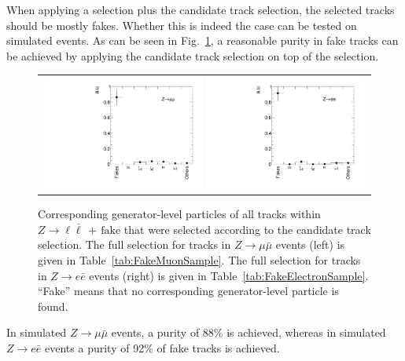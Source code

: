 When applying a \Zlep selection plus the candidate track selection, the selected tracks should be mostly fakes.
Whether this is indeed the case can be tested on simulated \Zlep events.
As can be seen in Fig.~\ref{fig:BkgComposition}, a reasonable purity in fake tracks can be achieved by applying the candidate track selection on top of the \Zlep selection.
\begin{figure}[!tb]
  \centering 
  \vspace{20pt}
  \begin{tabular}{c}
    \includegraphics[width=0.49\textwidth]{figures/analysis/Background/ParticleCompositionInFakeCS_Mu.pdf}
    \includegraphics[width=0.49\textwidth]{figures/analysis/Background/ParticleCompositionInFakeCS_Ele.pdf}
  \end{tabular}
  \caption{Corresponding generator-level particles of all tracks within $Z\rightarrow \ell \bar{\ell}\,+\,\text{fake}$ that were selected according to the candidate track selection. 
           The full selection for tracks in $Z\rightarrow \mu \bar{\mu}$ events (left) is given in Table~\ref{tab:FakeMuonSample}.
           The full selection for tracks in $Z\rightarrow e \bar{e}$ events (right) is given in Table~\ref{tab:FakeElectronSample}.
           ``Fake'' means that no corresponding generator-level particle is found. }
  \label{fig:BkgComposition}
\end{figure}
In simulated $Z\rightarrow\mu\bar{\mu}$ events, a purity of 88\% is achieved, whereas in simulated $Z\rightarrow e\bar{e}$ events a purity of 92\% of fake tracks is achieved.


